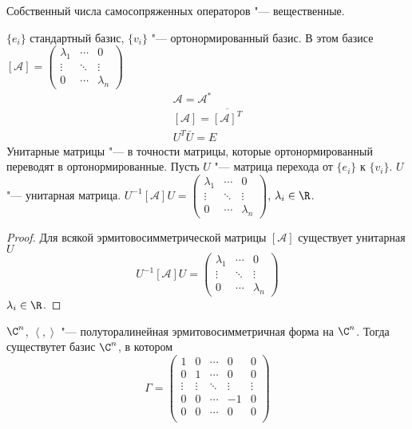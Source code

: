\begin{conseq}
	Собственный числа самосопряженных операторов "--- вещественные.
\end{conseq}
\begin{theorem}
$\{e_i\}$ стандартный базис, $\{v_i\}$ "--- ортонормированный базис.
В этом базисе
$
	[\mathcal A] = \begin{pmatrix}
		\lambda_1 & \cdots & 0 \\
		\vdots & \ddots & \vdots \\
		0 & \cdots & \lambda_n
	\end{pmatrix}
$
\begin{gather*}
	\mathcal A = \mathcal{A}^* \\
	[\mathcal A] = \overline{[\mathcal A]^T} \\
	U^T\bar U = E
\end{gather*}
Унитарные матрицы "--- в точности матрицы, которые ортонормированный переводят в ортонормированные.
Пусть $U$ "--- матрица перехода от $\{e_i\}$ к $\{v_i\}$.
$U$  "--- унитарная матрица.
$
	U^{-1} [\mathcal A] U = \begin{pmatrix}
		\lambda_1 & \cdots & 0 \\
		\vdots & \ddots & \vdots \\
		0 & \cdots & \lambda_n
	\end{pmatrix}
$, $\lambda_i \in \R$.
\end{theorem}
\begin{proof}
	Для всякой эрмитовосимметрической матрицы  $[\mathcal A]$ существует унитарная $U$
	\[
		U^{-1}[\mathcal A]U = \begin{pmatrix}
			\lambda_1 & \cdots & 0 \\
			\vdots & \ddots & \vdots \\
			0 & \cdots & \lambda_n
		\end{pmatrix}
	\]
	$\lambda_i \in \R$.
\end{proof}

\begin{theorem}
	$\C^n$, $\left<,\right>$ "--- полуторалинейная эрмитовосимметричная форма на $\C^n$.
	Тогда существутет базис $\C^n$, в котором
	\[
		\Gamma = \begin{pmatrix}
			1 & 0 &\cdots & 0 & 0 \\
			0 & 1 &\cdots & 0 & 0 \\
			\vdots&\vdots &\ddots&\vdots&\vdots\\
			0 & 0 &\cdots & -1 & 0 \\
			0 & 0 &\cdots & 0 & 0\\
		\end{pmatrix}
	\]
\end{theorem}

